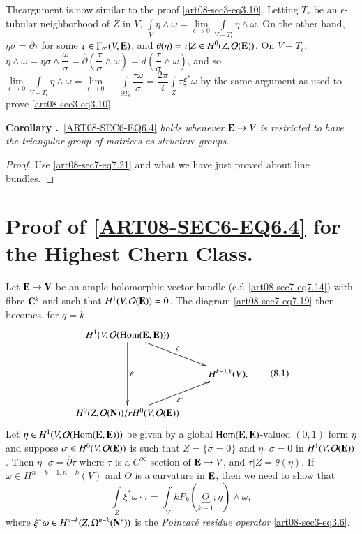 The\pageoriginale argument is now similar to the proof \eqref{art08-sec3-eq3.10}. Letting $T_{\epsilon}$ be an $\epsilon$-tubular neighborhood of $Z$ in $V$, $\int\limits_{V}\eta\wedge \omega=\lim\limits_{\epsilon\to 0}\int\limits_{V-T_{\epsilon}}\eta\wedge \omega$. On the other hand, $\eta\sigma=\overline{\partial}\tau$ for some $\tau\in \Gamma_{\infty}(V,\mathbf{E})$, and $\theta(\eta)=\tau|Z\in H^{0}(Z,\mathcal{O}(\mathbf{E}))$. On $V-T_{\epsilon}$, $\eta\wedge \omega=\eta\sigma\wedge\dfrac{\omega}{\sigma}=\overline{\partial}\left(\dfrac{\tau}{\sigma}\wedge\omega\right)=d\left(\dfrac{\tau}{\sigma}\wedge\omega\right)$, and so $\lim\limits_{\epsilon\to 0}\int\limits_{V-T_{\epsilon}}\eta\wedge\omega=\lim\limits_{\epsilon\to 0}-\int\limits_{\partial T_{\epsilon}}\dfrac{\tau\omega}{\sigma}=\dfrac{2\pi}{i}\int\limits_{Z}\tau\xi^{*}\omega$ by the same argument as used to prove \eqref{art08-sec3-eq3.10}.

\medskip
\noindent
{\bf Corollary .\label{art08-coro7.27}}~\eqref{ART08-SEC6-EQ6.4} {\em holds whenever $\mathbf{E}\to V$ is restricted to have the triangular group of matrices as structure groups.}

\begin{proof}
Use \eqref{art08-sec7-eq7.21} and what we have just proved about line bundles.
\end{proof}

\section{Proof of \texorpdfstring{\eqref{ART08-SEC6-EQ6.4}}{eq6.4} for the Highest Chern Class.}\label{art08-sec8}

Let $\mathbf{E}\to \mathbf{V}$ be an ample holomorphic vector bundle (c.f. \eqref{art08-sec7-eq7.14}) with fibre $\mathbf{C}^{k}$ and such that $H^{1}(V,\mathcal{O}(\mathbf{E}))=0$. The diagram \eqref{art08-sec7-eq7.19} then becomes, for $q=k$,
\begin{equation*}
\vcenter{\xymatrix{
H^{1}(V,\mathcal{O}(\Hom(\bfE,\bfE)))\ar[dd]^-{\theta}\ar[dr]^-{\zeta}\\
               & H^{k-1,k}(V).\\
H^{0}(Z,\mathcal{O}(\bfN))/rH^{0}(V,\mathcal{O}(\bfE))\ar[ur]_{\xi^{-}} &
}}\tag{8.1}\label{art08-sec8-eq8.1}
\end{equation*}
Let $\eta\in H^{1}(V,\mathcal{O}(\operatorname{\mathrm{Hom}}(\mathbf{E},\mathbf{E})))$ be given by a global $\operatorname{\mathrm{Hom}}(\mathbf{E},\mathbf{E})$-valued $(0,1)$ form $\eta$ and suppose $\sigma\in H^{0}(V,\mathcal{O}(\mathbf{E}))$ is such that $Z=\{\sigma=0\}$ and $\eta\cdot \sigma=0$ in $H^{1}(V,\mathcal{O}(\mathbf{E}))$. Then $\eta\cdot \sigma=\overline{\partial}\tau$ where $\tau$ is a $C^{\infty}$ section of $\mathbf{E}\to V$, and $\tau|Z=\theta(\eta)$. If $\omega\in H^{n-k+1,n-k}(V)$ and $\Theta$ is a curvature in $\mathbf{E}$, then we need to show that
\begin{equation*}
\int\limits_{Z}\xi^{*}\omega\cdot \tau = \int\limits_{V}kP_{k}(\underbrace{\Theta}_{k-1};\eta)\wedge\omega,\tag{8.2}\label{art08-sec8-eq8.2}
\end{equation*}
where $\xi^{*}\omega\in H^{n-k}(Z,\Omega^{n-k}(\mathbf{N}^{*}))$ is the {\em Poincar\'e residue operator} \eqref{art08-sec3-eq3.6}.

